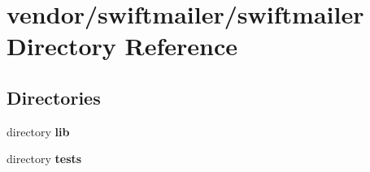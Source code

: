 \section{vendor/swiftmailer/swiftmailer Directory Reference}
\label{dir_6397f9171a35b8bc479ae98e7a73eeaa}
\subsection*{Directories}
\begin{DoxyCompactItemize}
\item 
directory {\bf lib}
\item 
directory {\bf tests}
\end{DoxyCompactItemize}
